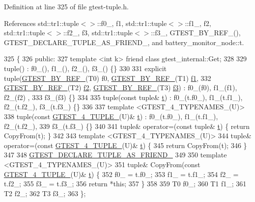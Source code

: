Definition at line 325 of file gtest-\/tuple.\+h.



References std\+::tr1\+::tuple$<$$>$\+::f0\+\_\+, f1, std\+::tr1\+::tuple$<$$>$\+::f1\+\_\+, f2, std\+::tr1\+::tuple$<$$>$\+::f2\+\_\+, f3, std\+::tr1\+::tuple$<$$>$\+::f3\+\_\+, G\+T\+E\+S\+T\+\_\+\+B\+Y\+\_\+\+R\+E\+F\+\_\+(), G\+T\+E\+S\+T\+\_\+\+D\+E\+C\+L\+A\+R\+E\+\_\+\+T\+U\+P\+L\+E\+\_\+\+A\+S\+\_\+\+F\+R\+I\+E\+N\+D\+\_\+, and battery\+\_\+monitor\+\_\+node\+::t.


\begin{DoxyCode}
325                         \{
326  \textcolor{keyword}{public}:
327   \textcolor{keyword}{template} <\textcolor{keywordtype}{int} k> \textcolor{keyword}{friend} \textcolor{keyword}{class }gtest\_internal::Get;
328 
329   tuple() : f0\_(), f1\_(), f2\_(), f3\_() \{\}
330 
331   \textcolor{keyword}{explicit} tuple(\hyperlink{gtest-tuple_8h_adcf9057737a411d833fac0382c13a181}{GTEST\_BY\_REF\_}(T0) f0, \hyperlink{gtest-tuple_8h_adcf9057737a411d833fac0382c13a181}{GTEST\_BY\_REF\_}(T1) 
      \hyperlink{namespacestd_1_1tr1_a9c0fa65b105f8e2f58ba59ecf75fd000}{f1},
332       \hyperlink{gtest-tuple_8h_adcf9057737a411d833fac0382c13a181}{GTEST\_BY\_REF\_}(T2) \hyperlink{namespacestd_1_1tr1_a87dd9e009868361317f587126dba63d4}{f2}, \hyperlink{gtest-tuple_8h_adcf9057737a411d833fac0382c13a181}{GTEST\_BY\_REF\_}(T3) \hyperlink{namespacestd_1_1tr1_a0f7c3b47d27d42d82d1a333ea420ce4e}{f3}) : f0\_(f0), f1\_(f1), f2\_(f2)
      ,
333       f3\_(f3) \{\}
334 
335   tuple(\textcolor{keyword}{const} tuple& \hyperlink{namespacebattery__monitor__node_a7a63d20d1ea461e280f4eb5b47f925cd}{t}) : f0\_(t.f0\_), f1\_(t.f1\_), f2\_(t.f2\_), f3\_(t.f3\_) \{\}
336 
337   \textcolor{keyword}{template} <GTEST\_4\_TYPENAMES\_(U)>
338   tuple(\textcolor{keyword}{const} \hyperlink{gtest-tuple_8h_a3625feb24d5e6eb9926fd558e4a2e3ff}{GTEST\_4\_TUPLE\_}(U)& \hyperlink{namespacebattery__monitor__node_a7a63d20d1ea461e280f4eb5b47f925cd}{t}) : f0\_(t.f0\_), f1\_(t.f1\_), f2\_(t.f2\_),
339       f3\_(t.f3\_) \{\}
340 
341   tuple& operator=(\textcolor{keyword}{const} tuple& \hyperlink{namespacebattery__monitor__node_a7a63d20d1ea461e280f4eb5b47f925cd}{t}) \{ \textcolor{keywordflow}{return} CopyFrom(t); \}
342 
343   \textcolor{keyword}{template} <GTEST\_4\_TYPENAMES\_(U)>
344   tuple& operator=(\textcolor{keyword}{const} \hyperlink{gtest-tuple_8h_a3625feb24d5e6eb9926fd558e4a2e3ff}{GTEST\_4\_TUPLE\_}(U)& \hyperlink{namespacebattery__monitor__node_a7a63d20d1ea461e280f4eb5b47f925cd}{t}) \{
345     \textcolor{keywordflow}{return} CopyFrom(t);
346   \}
347 
348   \hyperlink{gtest-tuple_8h_a2b20671273f514a88a6e9b8328e5f257}{GTEST\_DECLARE\_TUPLE\_AS\_FRIEND\_}
349 
350   \textcolor{keyword}{template} <GTEST\_4\_TYPENAMES\_(U)>
351   tuple& CopyFrom(\textcolor{keyword}{const} \hyperlink{gtest-tuple_8h_a3625feb24d5e6eb9926fd558e4a2e3ff}{GTEST\_4\_TUPLE\_}(U)& \hyperlink{namespacebattery__monitor__node_a7a63d20d1ea461e280f4eb5b47f925cd}{t}) \{
352     f0\_ = t.f0\_;
353     f1\_ = t.f1\_;
354     f2\_ = t.f2\_;
355     f3\_ = t.f3\_;
356     \textcolor{keywordflow}{return} *\textcolor{keyword}{this};
357   \}
358 
359   T0 f0\_;
360   T1 f1\_;
361   T2 f2\_;
362   T3 f3\_;
363 \};
\end{DoxyCode}
